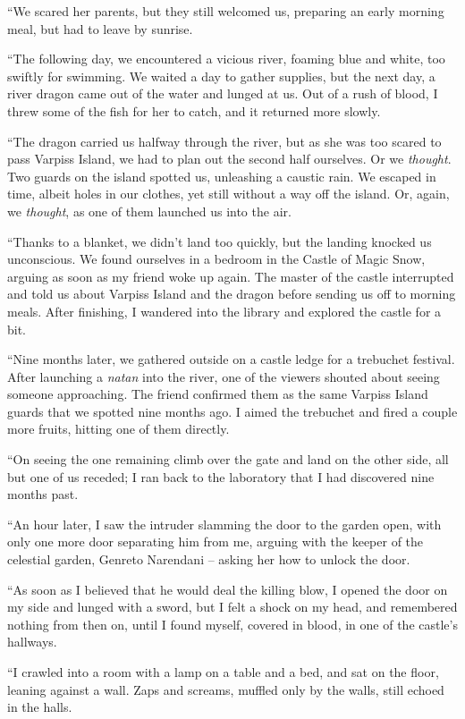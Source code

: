 ``We scared her parents, but they still welcomed us, preparing an early morning meal, but had to leave by sunrise.

``The following day, we encountered a vicious river, foaming blue and white, too swiftly for swimming. We waited a day to gather supplies, but the next day, a river dragon came out of the water and lunged at us. Out of a rush of blood, I threw some of the fish for her to catch, and it returned more slowly.

``The dragon carried us halfway through the river, but as she was too scared to pass Varpiss Island, we had to plan out the second half ourselves. Or we \emph{thought}. Two guards on the island spotted us, unleashing a caustic rain. We escaped in time, albeit holes in our clothes, yet still without a way off the island. Or, again, we \emph{thought}, as one of them launched us into the air.

``Thanks to a blanket, we didn't land too quickly, but the landing knocked us unconscious. We found ourselves in a bedroom in the Castle of Magic Snow, arguing as soon as my friend woke up again. The master of the castle interrupted and told us about Varpiss Island and the dragon before sending us off to morning meals. After finishing, I wandered into the library and explored the castle for a bit.

``Nine months later, we gathered outside on a castle ledge for a trebuchet festival. After launching a \emph{natan} into the river, one of the viewers shouted about seeing someone approaching. The friend confirmed them as the same Varpiss Island guards that we spotted nine months ago. I aimed the trebuchet and fired a couple more fruits, hitting one of them directly.

``On seeing the one remaining climb over the gate and land on the other side, all but one of us receded; I ran back to the laboratory that I had discovered nine months past.

``An hour later, I saw the intruder slamming the door to the garden open, with only one more door separating him from me, arguing with the keeper of the celestial garden, Genreto Narendani -- asking her how to unlock the door.

``As soon as I believed that he would deal the killing blow, I opened the door on my side and lunged with a sword, but I felt a shock on my head, and remembered nothing from then on, until I found myself, covered in blood, in one of the castle's hallways.

``I crawled into a room with a lamp on a table and a bed, and sat on the floor, leaning against a wall. Zaps and screams, muffled only by the walls, still echoed in the halls.


